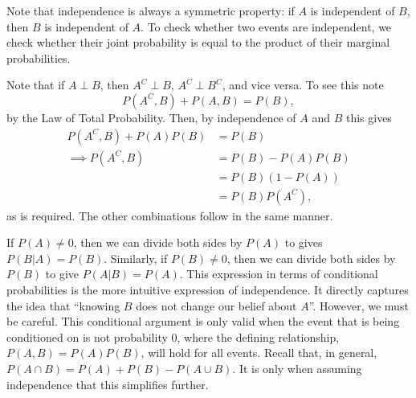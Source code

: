\documentclass[
  letterpaper,
  DIV=11,
  numbers=noendperiod]{scrreprt}
\theoremstyle{definition}
\theoremstyle{definition}
\theoremstyle{definition}
\theoremstyle{remark}
\begin{document}
Note that independence is always a symmetric property: if \(A\) is
independent of \(B\), then \(B\) is independent of \(A\). To check
whether two events are independent, we check whether their joint
probability is equal to the product of their marginal probabilities.

\begin{tcolorbox}[enhanced jigsaw, rightrule=.15mm, leftrule=.75mm, opacitybacktitle=0.6, title={Properties of Independence}, colframe=quarto-callout-warning-color-frame, opacityback=0, coltitle=black, breakable, toptitle=1mm, colbacktitle=quarto-callout-warning-color!10!white, bottomtitle=1mm, titlerule=0mm, arc=.35mm, colback=white, toprule=.15mm, left=2mm, bottomrule=.15mm]

Note that if \(A\perp B\), then \(A^C\perp B\), \(A^C\perp B^C\), and
vice versa. To see this note \[P(A^C, B) + P(A, B) = P(B),\] by the Law
of Total Probability. Then, by independence of \(A\) and \(B\) this
gives \begin{align*}
P(A^C, B) + P(A)P(B) &= P(B) \\
\implies P(A^C, B) &= P(B) - P(A)P(B) \\
&= P(B)(1 - P(A)) \\
&= P(B)P(A^C),\end{align*} as is required. The other combinations follow
in the same manner.

\end{tcolorbox}

If \(P(A)\neq 0\), then we can divide both sides by \(P(A)\) to gives
\(P(B|A) = P(B)\). Similarly, if \(P(B)\neq 0\), then we can divide both
sides by \(P(B)\) to give \(P(A|B)=P(A)\). This expression in terms of
conditional probabilities is the more intuitive expression of
independence. It directly captures the idea that ``knowing \(B\) does
not change our belief about \(A\)''. However, we must be careful. This
conditional argument is only valid when the event that is being
conditioned on is not probability \(0\), where the defining
relationship, \(P(A,B) = P(A)P(B)\), will hold for all events. Recall
that, in general, \(P(A\cap B) = P(A)+P(B)-P(A\cup B)\). It is only when
assuming independence that this simplifies further.
\end{document}

